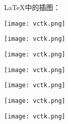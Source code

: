 \documentclass{ctexart}
\begin{document}
    \LaTeX{}中的插图：

    \texttt{[image: vctk.png]}

    \texttt{[image: vctk.png]}

    \texttt{[image: vctk.png]}

    \texttt{[image: vctk.png]}
    
    \texttt{[image: vctk.png]}

    \texttt{[image: vctk.png]}

    \texttt{[image: vctk.png]}
    
\end{document}
